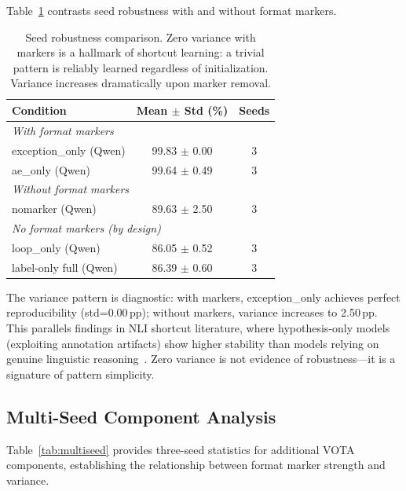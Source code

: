 \documentclass[11pt,a4paper]{article}
\newcommand{\pp}{\,\text{pp}}
\begin{document}
Table~\ref{tab:seed} contrasts seed robustness with and without format markers.

\begin{table}[t]
\centering
\small
\begin{tabular}{lcc}
\toprule
\textbf{Condition} & \textbf{Mean $\pm$ Std (\%)} & \textbf{Seeds} \\
\midrule
\multicolumn{3}{l}{\emph{With format markers}} \\
\quad exception\_only (Qwen) & 99.83 $\pm$ 0.00 & 3 \\
\quad ae\_only (Qwen) & 99.64 $\pm$ 0.49 & 3 \\
\midrule
\multicolumn{3}{l}{\emph{Without format markers}} \\
\quad nomarker (Qwen) & 89.63 $\pm$ 2.50 & 3 \\
\midrule
\multicolumn{3}{l}{\emph{No format markers (by design)}} \\
\quad loop\_only (Qwen) & 86.05 $\pm$ 0.52 & 3 \\
\quad label-only full (Qwen) & 86.39 $\pm$ 0.60 & 3 \\
\bottomrule
\end{tabular}
\caption{Seed robustness comparison. Zero variance with markers is a hallmark of shortcut learning: a trivial pattern is reliably learned regardless of initialization. Variance increases dramatically upon marker removal.}
\label{tab:seed}
\end{table}

The variance pattern is diagnostic: with markers, exception\_only achieves perfect reproducibility (std=0.00$\pp$); without markers, variance increases to 2.50$\pp$.
This parallels findings in NLI shortcut literature, where hypothesis-only models (exploiting annotation artifacts) show higher stability than models relying on genuine linguistic reasoning~\cite{gururangan2018annotation}.
Zero variance is not evidence of robustness---it is a signature of pattern simplicity.

\subsection{Multi-Seed Component Analysis}

Table~\ref{tab:multiseed} provides three-seed statistics for additional VOTA components, establishing the relationship between format marker strength and variance.
\end{document}
